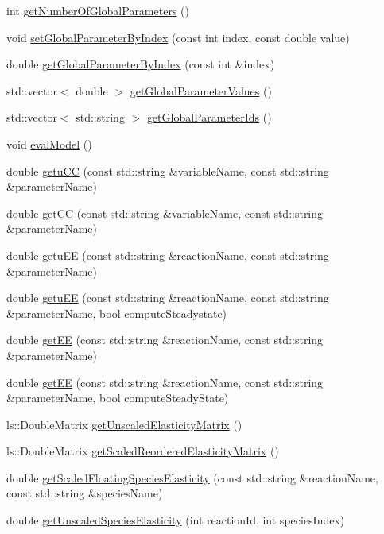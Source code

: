 \begin{DoxyCompactItemize}
\item 
int \hyperlink{classrr_1_1_road_runner_ae89a7ec21d11f3a6a8f23b94f8d41044}{get\-Number\-Of\-Global\-Parameters} ()
\item 
void \hyperlink{classrr_1_1_road_runner_aa90f680c2d8e3c1dbd67c90de015338c}{set\-Global\-Parameter\-By\-Index} (const int index, const double value)
\item 
double \hyperlink{classrr_1_1_road_runner_a241c4374d564427ef61df52862136574}{get\-Global\-Parameter\-By\-Index} (const int \&index)
\item 
std\-::vector$<$ double $>$ \hyperlink{classrr_1_1_road_runner_ad3c1380f0ac290590534899d4c9478a4}{get\-Global\-Parameter\-Values} ()
\item 
std\-::vector$<$ std\-::string $>$ \hyperlink{classrr_1_1_road_runner_a5344345156070f4bab82d9b81b7050de}{get\-Global\-Parameter\-Ids} ()
\item 
void \hyperlink{classrr_1_1_road_runner_ad3f4b6ef217424cb9b12c798dfd1129c}{eval\-Model} ()
\item 
double \hyperlink{classrr_1_1_road_runner_a7df50d5a0fa7265b62af24a2e996b6e0}{getu\-C\-C} (const std\-::string \&variable\-Name, const std\-::string \&parameter\-Name)
\item 
double \hyperlink{classrr_1_1_road_runner_a3d2c1d4727f38714ce6575a70d789429}{get\-C\-C} (const std\-::string \&variable\-Name, const std\-::string \&parameter\-Name)
\item 
double \hyperlink{classrr_1_1_road_runner_ad1a582f68475ad9e923dd23b12397d86}{getu\-E\-E} (const std\-::string \&reaction\-Name, const std\-::string \&parameter\-Name)
\item 
double \hyperlink{classrr_1_1_road_runner_a6957a9119e32959e4bbd47107a22f8a5}{getu\-E\-E} (const std\-::string \&reaction\-Name, const std\-::string \&parameter\-Name, bool compute\-Steadystate)
\item 
double \hyperlink{classrr_1_1_road_runner_a4faad67b12aaf15212f7c57697556d61}{get\-E\-E} (const std\-::string \&reaction\-Name, const std\-::string \&parameter\-Name)
\item 
double \hyperlink{classrr_1_1_road_runner_a54d7fece5e6ac6fcba4d113f62aff1e4}{get\-E\-E} (const std\-::string \&reaction\-Name, const std\-::string \&parameter\-Name, bool compute\-Steady\-State)
\item 
ls\-::\-Double\-Matrix \hyperlink{classrr_1_1_road_runner_a60d096cd0738a337899ae6c6109c178e}{get\-Unscaled\-Elasticity\-Matrix} ()
\item 
ls\-::\-Double\-Matrix \hyperlink{classrr_1_1_road_runner_a08b4ba485aeefc3275c49d393a18a2b1}{get\-Scaled\-Reordered\-Elasticity\-Matrix} ()
\item 
double \hyperlink{classrr_1_1_road_runner_a6a388eb7c0f64e215490fa606f458770}{get\-Scaled\-Floating\-Species\-Elasticity} (const std\-::string \&reaction\-Name, const std\-::string \&species\-Name)
\item 
double \hyperlink{classrr_1_1_road_runner_a5856b94d04fadfb190b407b126382503}{get\-Unscaled\-Species\-Elasticity} (int reaction\-Id, int species\-Index)
\end{DoxyCompactItemize}
